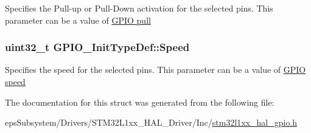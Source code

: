 Specifies the Pull-\/up or Pull-\/\-Down activation for the selected pins. This parameter can be a value of \hyperlink{group___g_p_i_o__pull}{G\-P\-I\-O pull} \hypertarget{struct_g_p_i_o___init_type_def_aae3b8ba407fb4f974cbce9cc03fc189d}{
\subsubsection[{Speed}]{\setlength{\rightskip}{0pt plus 5cm}uint32\-\_\-t G\-P\-I\-O\-\_\-\-Init\-Type\-Def\-::\-Speed}}\label{struct_g_p_i_o___init_type_def_aae3b8ba407fb4f974cbce9cc03fc189d}
Specifies the speed for the selected pins. This parameter can be a value of \hyperlink{group___g_p_i_o__speed}{G\-P\-I\-O speed} 

The documentation for this struct was generated from the following file\-:\begin{DoxyCompactItemize}
\item 
eps\-Subsystem/\-Drivers/\-S\-T\-M32\-L1xx\-\_\-\-H\-A\-L\-\_\-\-Driver/\-Inc/\hyperlink{stm32l1xx__hal__gpio_8h}{stm32l1xx\-\_\-hal\-\_\-gpio.\-h}\end{DoxyCompactItemize}
